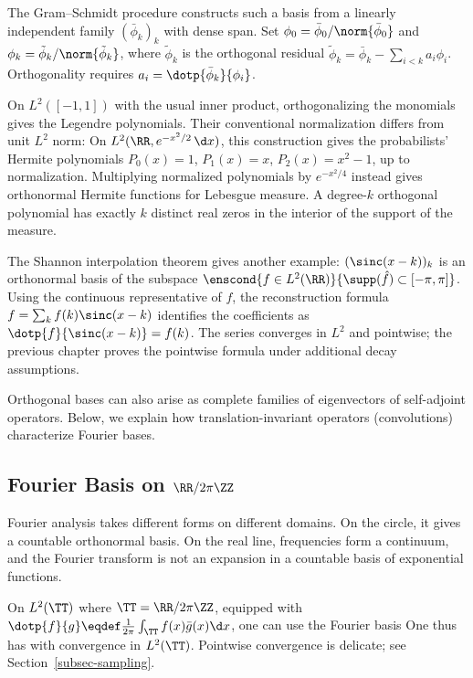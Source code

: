 The Gram--Schmidt procedure constructs such a basis from a linearly independent family $(\bar\phi_k)_k$ with dense span. Set $\phi_0=\bar\phi_0/\norm{\bar\phi_0}$ and $\phi_k=\tilde\phi_k/\norm{\tilde\phi_k}$, where $\tilde\phi_k$ is the orthogonal residual $\tilde\phi_k=\bar\phi_k - \sum_{i<k} a_i \phi_i$. Orthogonality requires $a_i = \dotp{\bar \phi_k}{\phi_i}$.

On $L^2([-1,1])$ with the usual inner product, orthogonalizing the monomials gives the Legendre polynomials. Their conventional normalization differs from unit $L^2$ norm:
On $L^2(\RR,e^{-x^2/2}\,\d x)$, this construction gives the probabilists' Hermite polynomials $P_0(x)=1$, $P_1(x)=x$, $P_2(x)=x^2-1$, up to normalization. Multiplying normalized polynomials by $e^{-x^2/4}$ instead gives orthonormal Hermite functions for Lebesgue measure. A degree-$k$ orthogonal polynomial has exactly $k$ distinct real zeros in the interior of the support of the measure.

The Shannon interpolation theorem gives another example: $( \sinc(x-k) )_k$ is an orthonormal basis of the subspace $\enscond{f\in L^2(\RR)}{\supp(\hat f) \subset [-\pi,\pi]}$. Using the continuous representative of $f$, the reconstruction formula $f=\sum_k f(k) \sinc(x-k)$ identifies the coefficients as $\dotp{f}{\sinc(x-k)} = f(k)$. The series converges in $L^2$ and pointwise; the previous chapter proves the pointwise formula under additional decay assumptions.


Orthogonal bases can also arise as complete families of eigenvectors of self-adjoint operators. Below, we explain how translation-invariant operators (convolutions) characterize Fourier bases.


\subsection{Fourier Basis on \texorpdfstring{$\RR/2\pi\ZZ$}{the Circle}}

Fourier analysis takes different forms on different domains. On the circle, it gives a countable orthonormal basis. On the real line, frequencies form a continuum, and the Fourier transform is not an expansion in a countable basis of exponential functions.

On $L^2(\TT)$ where $\TT=\RR/2\pi\ZZ$, equipped with $\dotp{f}{g} \eqdef \frac{1}{2\pi}\int_\TT f(x) \bar g(x) \d x$, one can use the Fourier basis 
One thus has
with convergence in $L^2(\TT)$. Pointwise convergence is delicate; see Section~\ref{subsec-sampling}.

